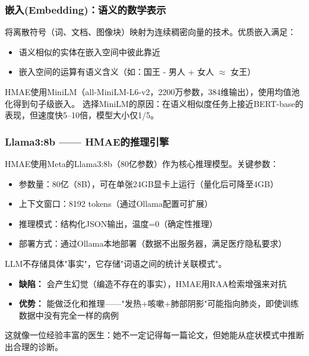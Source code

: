 \documentclass[11pt,a4paper]{ctexart}
\begin{document}
\subsubsection{嵌入(Embedding)：语义的数学表示}

\begin{defbox}[嵌入 (Embedding)]
将离散符号（词、文档、图像块）映射为连续稠密向量的技术。优质嵌入满足：
\begin{itemize}[nosep]
\item 语义相似的实体在嵌入空间中彼此靠近
\item 嵌入空间的运算有语义含义（如：国王 - 男人 + 女人 $\approx$ 女王）
\end{itemize}
\end{defbox}

HMAE使用MiniLM（all-MiniLM-L6-v2，2200万参数，384维输出），使用均值池化得到句子级嵌入。
选择MiniLM的原因：在语义相似度任务上接近BERT-base的表现，但速度快5--10倍，模型大小仅1/5。

\subsubsection{Llama3:8b —— HMAE的推理引擎}

HMAE使用Meta的Llama3:8b（80亿参数）作为核心推理模型。关键参数：
\begin{itemize}[nosep]
\item 参数量：80亿（8B），可在单张24GB显卡上运行（量化后可降至4GB）
\item 上下文窗口：8192 tokens（通过Ollama配置可扩展）
\item 推理模式：结构化JSON输出，温度=0（确定性推理）
\item 部署方式：通过Ollama本地部署（数据不出服务器，满足医疗隐私要求）
\end{itemize}

\begin{keybox}
LLM不存储具体"事实"，它存储"词语之间的统计关联模式"。
\begin{itemize}[nosep]
\item \textbf{缺陷：} 会产生幻觉（编造不存在的事实），HMAE用RAA检索增强来对抗
\item \textbf{优势：} 能做泛化和推理——"发热+咳嗽+肺部阴影"可能指向肺炎，即使训练数据中没有完全一样的病例
\end{itemize}
这就像一位经验丰富的医生：她不一定记得每一篇论文，但她能从症状模式中推断出合理的诊断。
\end{keybox}

\newpage
\end{document}
